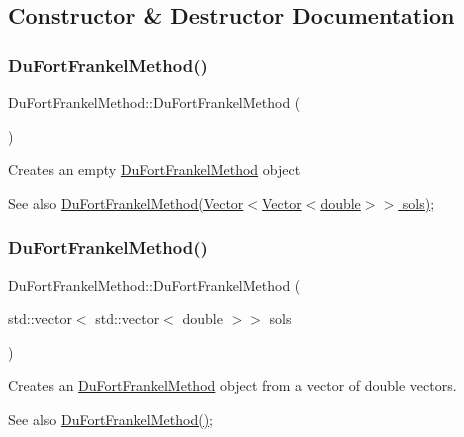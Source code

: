 \subsection{Constructor \& Destructor Documentation}
\mbox{\label{class_du_fort_frankel_method_ae4f8e7c2d498265fa8b8e6ea0bd74288}} 
\subsubsection{\texorpdfstring{Du\+Fort\+Frankel\+Method()}{DuFortFrankelMethod()}\hspace{0.1cm}{\footnotesize\ttfamily [1/2]}}
{\footnotesize\ttfamily Du\+Fort\+Frankel\+Method\+::\+Du\+Fort\+Frankel\+Method (\begin{DoxyParamCaption}{ }\end{DoxyParamCaption})}

Creates an empty \hyperlink{class_du_fort_frankel_method}{Du\+Fort\+Frankel\+Method} object \begin{DoxySeeAlso}{See also}
\hyperlink{class_du_fort_frankel_method}{Du\+Fort\+Frankel\+Method(\+Vector$<$\+Vector$<$double$>$$>$ sols)}; 
\end{DoxySeeAlso}
\mbox{\label{class_du_fort_frankel_method_a5914f09f3f3aa00d0ac1d270e73613e2}} 
\subsubsection{\texorpdfstring{Du\+Fort\+Frankel\+Method()}{DuFortFrankelMethod()}\hspace{0.1cm}{\footnotesize\ttfamily [2/2]}}
{\footnotesize\ttfamily Du\+Fort\+Frankel\+Method\+::\+Du\+Fort\+Frankel\+Method (\begin{DoxyParamCaption}\item[{std\+::vector$<$ std\+::vector$<$ double $>$$>$}]{sols }\end{DoxyParamCaption})}

Creates an \hyperlink{class_du_fort_frankel_method}{Du\+Fort\+Frankel\+Method} object from a vector of double vectors. \begin{DoxySeeAlso}{See also}
\hyperlink{class_du_fort_frankel_method_ae4f8e7c2d498265fa8b8e6ea0bd74288}{Du\+Fort\+Frankel\+Method()}; 
\end{DoxySeeAlso}

